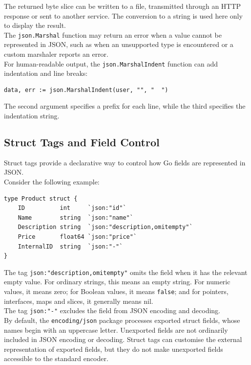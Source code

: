 The returned byte slice can be written to a file, transmitted through an HTTP response or sent to another service. The conversion to a string is used here only to display the result.\\

The \texttt{json.Marshal} function may return an error when a value cannot be represented in JSON, such as when an unsupported type is encountered or a custom marshaler reports an error.\\

For human-readable output, the \texttt{json.MarshalIndent} function can add indentation and line breaks:

\begin{lstlisting}
data, err := json.MarshalIndent(user, "", "  ")
\end{lstlisting}

The second argument specifies a prefix for each line, while the third specifies the indentation string.\\

\subsection{Struct Tags and Field Control}

Struct tags provide a declarative way to control how Go fields are represented in JSON.\\

Consider the following example:

\begin{lstlisting}
type Product struct {
    ID          int     `json:"id"`
    Name        string  `json:"name"`
    Description string  `json:"description,omitempty"`
    Price       float64 `json:"price"`
    InternalID  string  `json:"-"`
}
\end{lstlisting}

The tag \texttt{json:"description,omitempty"} omits the field when it has the relevant empty value. For ordinary strings, this means an empty string. For numeric values, it means zero; for Boolean values, it means \texttt{false}; and for pointers, interfaces, maps and slices, it generally means nil.\\

The tag \texttt{json:"-"} excludes the field from JSON encoding and decoding.\\

By default, the \texttt{encoding/json} package processes exported struct fields, whose names begin with an uppercase letter. Unexported fields are not ordinarily included in JSON encoding or decoding. Struct tags can customise the external representation of exported fields, but they do not make unexported fields accessible to the standard encoder.\\

